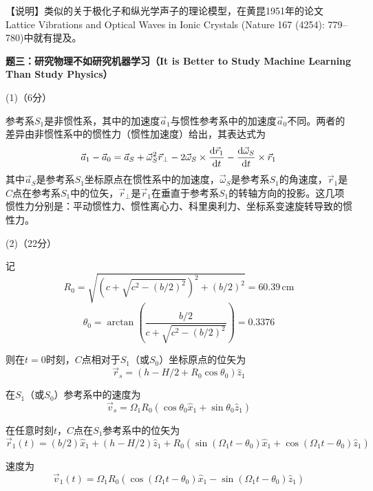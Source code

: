 \documentclass[10pt,a4paper,onecolumn,UTF8]{ctexart}
\begin{document}
	【说明】类似的关于极化子和纵光学声子的理论模型，在黄昆1951年的论文Lattice Vibrations and Optical Waves in Ionic Crystals (Nature 167 (4254): 779–780)中就有提及。
	
	
	
	\setcounter{equation}{0}
	\newpage

	\noindent
	\textbf{题三：研究物理不如研究机器学习（It is Better to Study Machine Learning Than Study Physics）}
	
	(1)（6分）
	
	参考系$S_1$是非惯性系，其中的加速度$\vec a_1$与惯性参考系中的加速度$\vec a_0$不同。两者的差异由非惯性系中的惯性力（惯性加速度）给出，其表达式为
	\begin{equation}\label{E3-01}
		\vec a_1-\vec a_0=\vec a_S+\vec\omega_S^2\vec r_{\perp}-2\vec\omega_S\times\frac{\mathrm{d} \vec r_1}{\mathrm{d} t}-\frac{\mathrm{d} \vec\omega_S}{\mathrm{d} t}\times\vec r_1
	\end{equation}
	其中$\vec a_S$是参考系$S_1$坐标原点在惯性系中的加速度，$\vec\omega_S$是参考系$S_1$的角速度，$\vec r_1$是$C$点在参考系$S_1$中的位矢，$\vec r_{\perp}$是$\vec r_1$在垂直于参考系$S_1$的转轴方向的投影。这几项惯性力分别是：平动惯性力、惯性离心力、科里奥利力、坐标系变速旋转导致的惯性力。
	
	(2)（22分）
	
	记
	$$R_0=\sqrt{\left(c+\sqrt{c^2-\left(b/2\right)^2}\right)^2+(b/2)^2}=60.39\,\text{cm}$$
	$$\theta_0=\arctan\left(\frac{b/2}{c+\sqrt{c^2-\left(b/2\right)^2}}\right)=0.3376$$
	
	则在$t=0$时刻，$C$点相对于$S_1$（或$S_0$）坐标原点的位矢为
	\begin{equation}\label{E3-02}
		\vec r_s=\left(h-H/2+R_0\cos\theta_0\right)\hat z_1
	\end{equation}
	
	在$S_1$（或$S_0$）参考系中的速度为
	\begin{equation}\label{E3-03}
		\vec v_s=\Omega_1R_0\left(\cos\theta_0\hat x_1+\sin\theta_0\hat z_1\right)
	\end{equation}	

	在任意时刻$t$，$C$点在$S_1$参考系中的位矢为
	\begin{equation}\label{E3-04}
		\vec r_1(t)=(b/2)\hat x_1+(h-H/2)\hat z_1+R_0\left(\sin(\Omega_1t-\theta_0)\hat x_1+\cos(\Omega_1t-\theta_0)\hat z_1\right)
	\end{equation}
	
	速度为
	\begin{equation}
		\vec v_1(t)=\Omega_1R_0\left(\cos(\Omega_1t-\theta_0)\hat x_1-\sin(\Omega_1t-\theta_0)\hat z_1\right)
	\end{equation}
	
\end{document}
